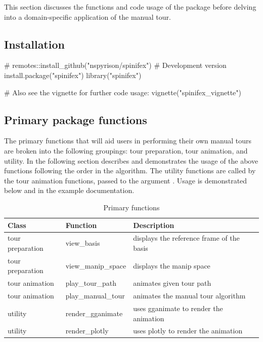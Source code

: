 This section discusses the functions and code usage of the package
before delving into a domain-specific application of the manual tour.

\hypertarget{installation}{%
\subsection{Installation}\label{installation}}

\begin{Schunk}
\begin{Sinput}
# remotes::install_github("nspyrison/spinifex") # Development version
install.package("spinifex")
library("spinifex")

# Also see the vignette for further code usage: 
vignette("spinifex_vignette")
\end{Sinput}
\end{Schunk}

\hypertarget{primary-package-functions}{%
\subsection{Primary package functions}\label{primary-package-functions}}

The primary functions that will aid users in performing their own manual
tours are broken into the following groupings: tour preparation, tour
animation, and utility. In the following section describes and
demonstrates the usage of the above functions following the order in the
algorithm. The utility functions are called by the tour animation
functions, passed to the argument . Usage is
demonstrated below and in the example documentation.

\begin{Schunk}
\begin{table}[t]

\caption{\label{tab:functionsTable}Primary functions}
\centering
\begin{tabular}{lll}
\toprule
Class & Function & Description\\
\midrule
tour preparation & view\_basis & displays the reference frame of the basis\\
tour preparation & view\_manip\_space & displays the manip space\\
tour animation & play\_tour\_path & animates given tour path\\
tour animation & play\_manual\_tour & animates the manual tour algorithm\\
utility & render\_gganimate & uses gganimate to render the animation\\
\addlinespace
utility & render\_plotly & uses plotly to render the animation\\
\bottomrule
\end{tabular}
\end{table}

\end{Schunk}

